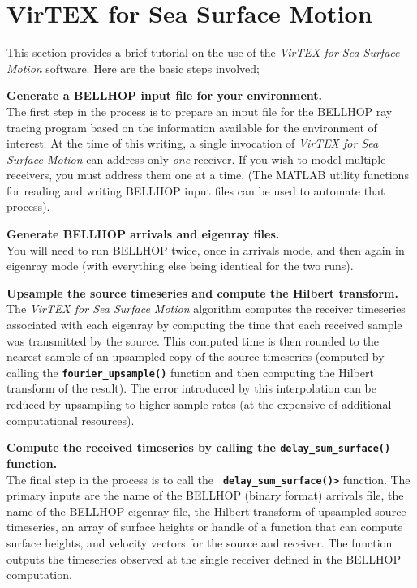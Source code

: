 \documentclass[12pt, letterpaper, oneside]{article}
\begin{document}
\section{VirTEX for Sea Surface Motion}
This section provides a brief tutorial on the use of the {\em VirTEX for
Sea Surface Motion} software. Here are the basic steps involved;

\begin{description}
\item {\bf Generate a BELLHOP input file for your environment.}\hfill \\
The first step in the process is to prepare an input file for the BELLHOP
ray tracing program based on the information available for the environment
of interest. At the time of this writing, a single invocation of {\em
VirTEX for Sea Surface Motion} can address only {\em one} receiver.
If you wish to model multiple receivers, you must address them one at
a time. (The MATLAB utility functions for reading and writing BELLHOP
input files can be used to automate that process).

\item {\bf Generate BELLHOP arrivals and eigenray files.}\hfill \\
You will need to run BELLHOP twice, once in arrivals mode, and then again
in eigenray mode (with everything else being identical for the two runs).

\item {\bf Upsample the source timeseries and compute the Hilbert transform.}\hfill \\
The {\em VirTEX for Sea Surface Motion} algorithm computes the receiver
timeseries associated with each eigenray by computing the time that each
received sample was transmitted by the source. This computed time is then
rounded to the nearest sample of an upsampled copy of the source
timeseries (computed by calling the {\tt \bf fourier\_upsample()}
function and then computing the Hilbert transform of the result).
The error introduced by this interpolation can be reduced by
upsampling to higher sample rates (at the expensive of additional
computational resources).

\item {\bf Compute the received timeseries by calling the {\tt \bf delay\_sum\_surface()} function.}\hfill \\
The final step in the process is to call the {\tt \bf
delay\_sum\_surface()>} function. The primary inputs are the name of
the BELLHOP (binary format) arrivals file, the name of the BELLHOP
eigenray file, the Hilbert transform of upsampled source timeseries,
an array of surface heights or handle of a function that can compute
surface heights, and velocity vectors for the source and receiver.
The function outputs the timeseries observed at the single receiver
defined in the BELLHOP computation.

\end{description}
\end{document}
